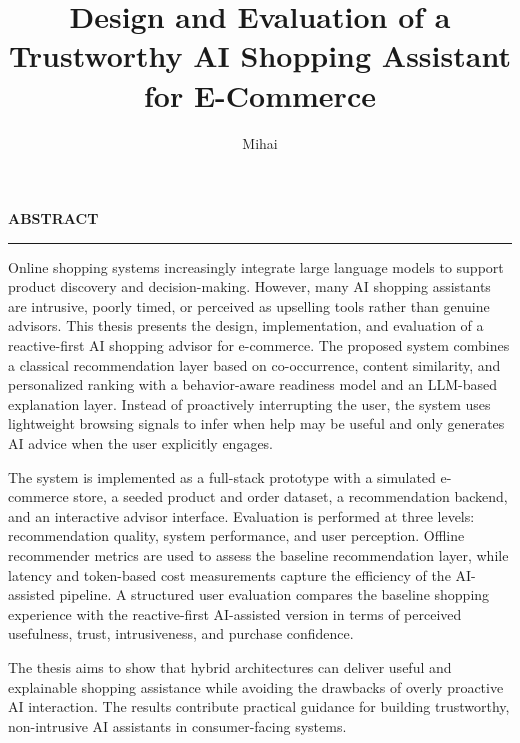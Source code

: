 \documentclass[12pt]{report}
\begin{document}
\title{Design and Evaluation of a Trustworthy AI Shopping Assistant
for E-Commerce}
\author{Mihai}

\maketitle

\newpage
\thispagestyle{empty}
\mbox{}
\newpage
{}

\cleardoublepage
\textbf{\Large ABSTRACT}
\vspace{0.5cm}
\hrule
\vspace{0.5cm}

Online shopping systems increasingly integrate large language models
to support product discovery and decision-making. However, many AI
shopping assistants are intrusive, poorly timed, or perceived as
upselling tools rather than genuine advisors. This thesis presents
the design, implementation, and evaluation of a reactive-first AI
shopping advisor for e-commerce. The proposed system combines a
classical recommendation layer based on co-occurrence, content
similarity, and personalized ranking with a behavior-aware readiness
model and an LLM-based explanation layer. Instead of proactively
interrupting the user, the system uses lightweight browsing signals
to infer when help may be useful and only generates AI advice when
the user explicitly engages.

The system is implemented as a full-stack prototype with a simulated
e-commerce store, a seeded product and order dataset, a
recommendation backend, and an interactive advisor interface.
Evaluation is performed at three levels: recommendation quality,
system performance, and user perception. Offline recommender metrics
are used to assess the baseline recommendation layer, while latency
and token-based cost measurements capture the efficiency of the
AI-assisted pipeline. A structured user evaluation compares the
baseline shopping experience with the reactive-first AI-assisted
version in terms of perceived usefulness, trust, intrusiveness, and
purchase confidence.

The thesis aims to show that hybrid architectures can deliver useful
and explainable shopping assistance while avoiding the drawbacks of
overly proactive AI interaction. The results contribute practical
guidance for building trustworthy, non-intrusive AI assistants in
consumer-facing systems.

\tableofcontents

\newpage
{}










\end{document}

